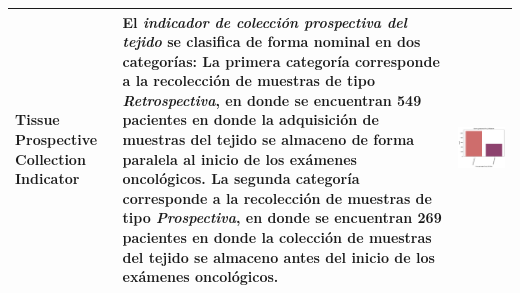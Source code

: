 \begin{table}[!htb]
	\footnotesize
	\begin{threeparttable}
		\begin{tabular}{p{2.5cm} p{7cm} p{6.5cm}} \toprule

			Tissue Prospective Collection Indicator
			& El \textit{indicador de colección prospectiva del tejido} se clasifica de forma nominal en dos categorías: La primera categoría corresponde a la recolección de muestras de tipo \textit{Retrospectiva}, en donde se encuentran 549 pacientes en donde la adquisición de muestras del tejido se almaceno de forma paralela al inicio de los exámenes oncológicos. La segunda categoría corresponde a la recolección de muestras de tipo \textit{Prospectiva}, en donde se encuentran 269 pacientes en donde la colección de muestras del tejido se almaceno antes del inicio de los exámenes oncológicos.
			
			& \begin{center}\includegraphics[width=1\linewidth]{NOTEBOOK/IMAGENES_DESCRIPTIVAS/36_tissue_prospective_indicator}\end{center}
			\\ \hline
			

\end{tabular}
\end{threeparttable}
\end{table}

